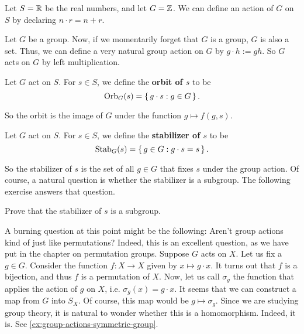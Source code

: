 \documentclass[./main.tex]{subfiles}
\begin{document}
\begin{example}
    Let $S = \mathbb{R}$ be the real numbers, and let $G = \mathbb{Z}$. We can define an
    action of $G$ on $S$ by declaring $n \cdot r = n + r$. 
\end{example}

\begin{example}
    Let $G$ be a group. Now, if we momentarily forget that $G$ is a group, $G$
    is also a set. Thus, we can define a very natural group action on $G$ by $g
    \cdot h := gh$. So $G$ acts on $G$ by left multiplication. 
\end{example}

\begin{definition}[Orbit]
\label{def:group-action-orbit}
    Let $G$ act on $S$. For $s \in S$, we define the \textbf{orbit of $s$} to be 
    \[
        \operatorname{Orb}_G (s) = \set{g \cdot s: g \in G}.
    \]
\end{definition}
So the orbit is the image of $G$ under the function $g \mapsto f(g, s)$.

\begin{definition}[Stabilizer]
\label{def:group-action-stabilizer}
    Let $G$ act on $S$. For $s \in S$, we define the \textbf{stabilizer of $s$}
    to be 
    \[
        \operatorname{Stab}_G (s) = \set{g \in G: g \cdot s = s}.
    \]
\end{definition}
So the stabilizer of $s$ is the set of all $g \in G$ that fixes $s$ under the
group action. Of course, a natural question is whether the stabilizer is a
subgroup. The following exercise answers that question.

\begin{exercise}
    Prove that the stabilizer of $s$ is a subgroup.
\end{exercise}

A burning question at this point might be the following: Aren't group actions
kind of just like permutations? Indeed, this is an excellent question, as we
have put in the chapter on permutation groups. Suppose $G$ acts on $X$. Let us
fix a $g \in G$. Consider the function $f: X \to X$ given by $x \mapsto g \cdot
x$. It turns out that $f$ is a bijection, and thus $f$ is a permutation of $X$.
Now, let us call $\sigma_g$ the function that applies the action of $g$ on $X$,
i.e. $\sigma_g(x) = g \cdot x$. It seems that we can construct a map from $G$
into $S_X$. Of course, this map would be $g \mapsto \sigma_g$. Since we are
studying group theory, it is natural to wonder whether this is a homomorphism.
Indeed, it is. See \cref{ex:group-actions-symmetric-group}.
\end{document}
